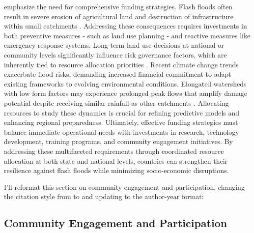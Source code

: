 emphasize the need for comprehensive funding strategies. Flash floods often result in severe erosion of agricultural land and destruction of infrastructure within small catchments \citep{Archer2019}. Addressing these consequences requires investments in both preventive measures - such as land use planning - and reactive measures like emergency response systems. Long-term land use decisions at national or community levels significantly influence risk governance factors, which are inherently tied to resource allocation priorities \citep{Terti2015}. Recent climate change trends exacerbate flood risks, demanding increased financial commitment to adapt existing frameworks to evolving environmental conditions. Elongated watersheds with low form factors may experience prolonged peak flows that amplify damage potential despite receiving similar rainfall as other catchments \citep{Dinis2021}. Allocating resources to study these dynamics is crucial for refining predictive models and enhancing regional preparedness. Ultimately, effective funding strategies must balance immediate operational needs with investments in research, technology development, training programs, and community engagement initiatives. By addressing these multifaceted requirements through coordinated resource allocation at both state and national levels, countries can strengthen their resilience against flash floods while minimizing socio-economic disruptions.

I'll reformat this section on community engagement and participation, changing the citation style from \parencite{} to \citep{} and updating to the author-year format:
\subsection{Community Engagement and Participation}
